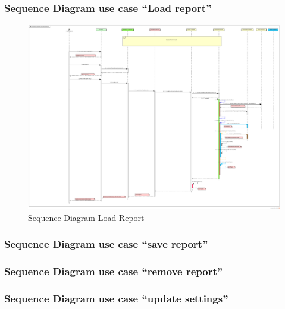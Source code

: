 	\subsubsection{Sequence Diagram use case ``Load report''}
	\begin{figure}[h]
		\centering
		\includegraphics[width=1\textwidth]{SequenceDiagramLoadReport.png}
		\caption{Sequence Diagram Load Report}
	\end{figure}
	\clearpage
	\newpage
	\subsubsection{Sequence Diagram use case ``save report''}

	\clearpage
	\newpage 
	\subsubsection{Sequence Diagram use case ``remove report''}

	\clearpage
	\newpage
	
	\subsubsection{Sequence Diagram use case ``update settings''}

	\clearpage
	\newpage


